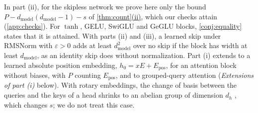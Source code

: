 \documentclass[10pt]{article}
\theoremstyle{definition}
\theoremstyle{remark}
\newcommand{\dm}{d_{\mathrm{model}}}
\DeclareRobustCommand{\cpref}[2]{\hyperref[#1:#2]{\cref*{#1}(#2)}}
\begin{document}
In part (ii), for the skipless network we prove here only the bound $P - \dm(\dm-1) - s$ of \cpref{thm:count}{ii}, which our checks attain (\cref{app:checks}). For $\tanh$, GELU, SwiGLU and GeGLU blocks, \cref{conj:equality} states that it is attained. With parts (ii) and (iii), a learned skip under RMSNorm with $\varepsilon > 0$ adds at least $\dm^2$ over no skip if the block has width at least $\dm$, as an identity skip does without normalization. Part (i) extends to a learned absolute position embedding, $h_0 = xE + E_{\mathrm{pos}}$, for an attention block without biases, with $P$ counting $E_{\mathrm{pos}}$, and to grouped-query attention (\emph{Extensions of part (i)} below). With rotary embeddings, the change of basis between the queries and the keys of a head shrinks to an abelian group of dimension $d_h$ \citep[Theorem~4.2]{tran2026equivalence}, which changes $s$; we do not treat this case.
\end{document}
